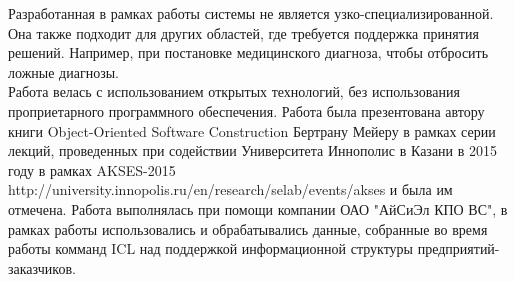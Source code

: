 Разработанная в рамках работы системы не является узко-специализированной. Она также подходит для других областей, где требуется поддержка принятия решений. Например, при постановке медицинского диагноза, чтобы отбросить ложные диагнозы. \\
Работа велась с использованием открытых технологий, без использования проприетарного программного обеспечения. Работа была презентована автору книги Object-Oriented Software Construction \cite{Meyer} Бертрану Мейеру в рамках серии лекций, проведенных при содействии Университета Иннополис в Казани в 2015 году в рамках AKSES-2015 http://university.innopolis.ru/en/research/selab/events/akses и была им отмечена.  
Работа выполнялась при помощи компании ОАО "АйСиЭл КПО ВС", в рамках работы использовались и обрабатывались данные, собранные во время работы комманд ICL над поддержкой информационной структуры предприятий-заказчиков.

\clearpage